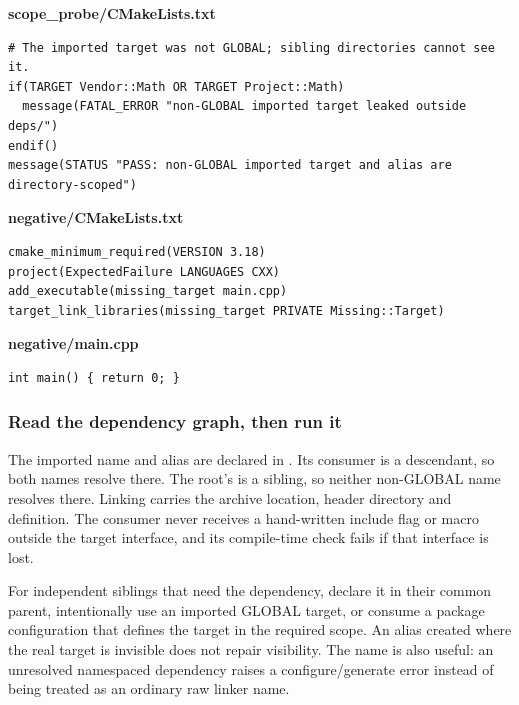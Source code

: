 \textbf{scope\_probe/CMakeLists.txt}

\begin{verbatim}
# The imported target was not GLOBAL; sibling directories cannot see it.
if(TARGET Vendor::Math OR TARGET Project::Math)
  message(FATAL_ERROR "non-GLOBAL imported target leaked outside deps/")
endif()
message(STATUS "PASS: non-GLOBAL imported target and alias are directory-scoped")
\end{verbatim}

\textbf{negative/CMakeLists.txt}

\begin{verbatim}
cmake_minimum_required(VERSION 3.18)
project(ExpectedFailure LANGUAGES CXX)
add_executable(missing_target main.cpp)
target_link_libraries(missing_target PRIVATE Missing::Target)
\end{verbatim}

\textbf{negative/main.cpp}

\begin{verbatim}
int main() { return 0; }
\end{verbatim}

\subsubsection{Read the dependency graph, then run it}\label{05-engine-i-ch012-read-the-dependency-graph-then-run-it}

\hypertarget{05-engine-i-ch012-read-the-dependency-graph-then-run-it}{}

The imported name and alias are declared in . Its consumer is a descendant, so both names resolve there. The root's  is a sibling, so neither non-GLOBAL name resolves there. Linking  carries the archive location, header directory and  definition. The consumer never receives a hand-written include flag or macro outside the target interface, and its compile-time check fails if that interface is lost.

For independent siblings that need the dependency, declare it in their common parent, intentionally use an imported GLOBAL target, or consume a package configuration that defines the target in the required scope. An alias created where the real target is invisible does not repair visibility. The \BookInlineCode{{:}{:}}{::} name is also useful: an unresolved namespaced dependency raises a configure/generate error instead of being treated as an ordinary raw linker name.

